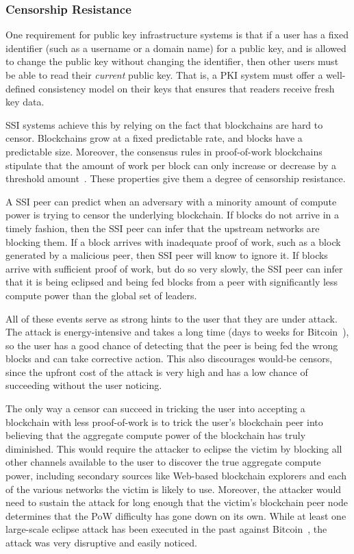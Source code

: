 \subsubsection{Censorship Resistance}

One requirement for public key infrastructure systems is that if a user has a
fixed identifier (such as a username or a domain name) for a public key, and is
allowed to change the public key without changing the identifier, 
then other users must be able to read their \emph{current}
public key.  That is, a PKI system must offer a well-defined consistency model
on their keys that ensures that readers receive fresh key data.

SSI systems achieve this by relying on the fact that blockchains are hard to
censor.  Blockchains grow at a fixed
predictable rate, and blocks have a predictable size.  Moreover,
the consensus rules in proof-of-work blockchains stipulate that 
the amount of work per block can only increase or decrease by a threshold
amount~\cite{bitcoin-difficulty-adjustment-rules}.  These properties give them a
degree of censorship resistance.

A SSI peer can predict when an adversary with a minority amount of compute power
is trying to censor the underlying blockchain.  If
blocks do not arrive in a timely fashion, then the SSI peer can infer that the upstream
networks are blocking them.  If a block arrives with inadequate proof of work,
such as a block generated by a malicious peer, then SSI peer will know to ignore
it.  If blocks arrive with sufficient proof of work, but do so very slowly, the
SSI peer can infer that it is being eclipsed and being fed
blocks from a peer with significantly less compute power than the global set of
leaders.

All of these events serve as strong hints to the user that they are under
attack.  The attack is energy-intensive and takes a long time (days to weeks for
Bitcoin~\cite{bitcoin-difficulty-adjustment-rules}),
so the user has a good chance of detecting that the peer is being fed the wrong
blocks and can take corrective action.  This also discourages would-be censors,
since the upfront cost of the attack is very high and has a low chance of
succeeding without the user noticing.

The only way a censor can succeed in tricking the user into accepting a
blockchain with less proof-of-work
is to trick the user's blockchain peer into believing that the aggregate compute
power of the blockchain has truly diminished.  This would require the attacker
to eclipse the victim by blocking all other channels available to the user to discover the true aggregate
compute power, including secondary sources like Web-based blockchain explorers
and each of the various networks the victim is likely to use.
Moreover, the attacker would need to sustain the attack for long
enough that the victim's blockchain peer node determines that the PoW difficulty
has gone down on its own.  While at least one large-scale eclipse attack
has been executed in the past against
Bitcoin~\cite{bitcoin-bgp-attack}, the attack was very disruptive and easily
noticed.

